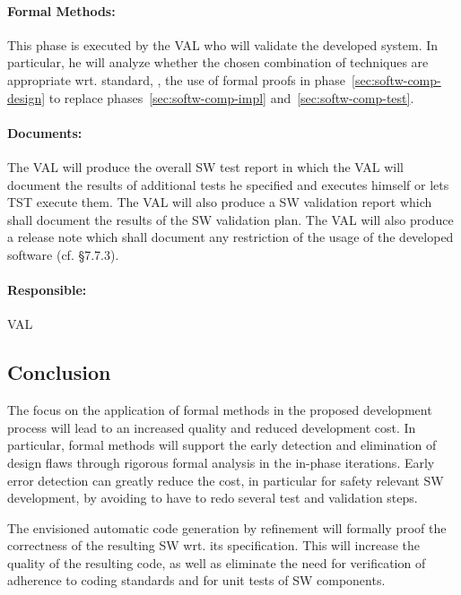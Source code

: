 \paragraph{Formal Methods:}
\label{sec:sw-test-formal-methods}
This phase is executed by the VAL who will validate the developed system. In
particular, he will analyze whether the chosen combination of techniques are
appropriate wrt. standard, \eg, the use of formal proofs in
phase~\ref{sec:softw-comp-design} to replace phases~\ref{sec:softw-comp-impl}
and~\ref{sec:softw-comp-test}.

\paragraph{Documents:}
\label{sec:sw-test-documents}
The VAL will produce the overall SW test report in which the VAL will document
the results of additional tests he specified and executes himself or lets TST
execute them. The VAL will also produce a SW validation report which shall
document the results of the SW validation plan. The VAL will also produce a
release note which shall document any restriction of the usage of the developed
software (cf. §7.7.3).

\paragraph{Responsible:}
\label{sec:sw-test-responsible}
VAL


\subsection{Conclusion}
\label{sec:conclusion-fm-process}

The focus on the application of formal methods in the proposed development
process will lead to an increased quality and reduced development cost. In
particular, formal methods will support the early detection and elimination of
design flaws through rigorous formal analysis in the in-phase iterations. Early
error detection can greatly reduce the cost, in particular for safety relevant
SW development, by avoiding to have to redo several test and validation steps.

The envisioned automatic code generation by refinement will formally proof the
correctness of the resulting SW wrt. its specification. This will increase the
quality of the resulting code, as well as eliminate the need for verification of
adherence to coding standards and for unit tests of SW components.

